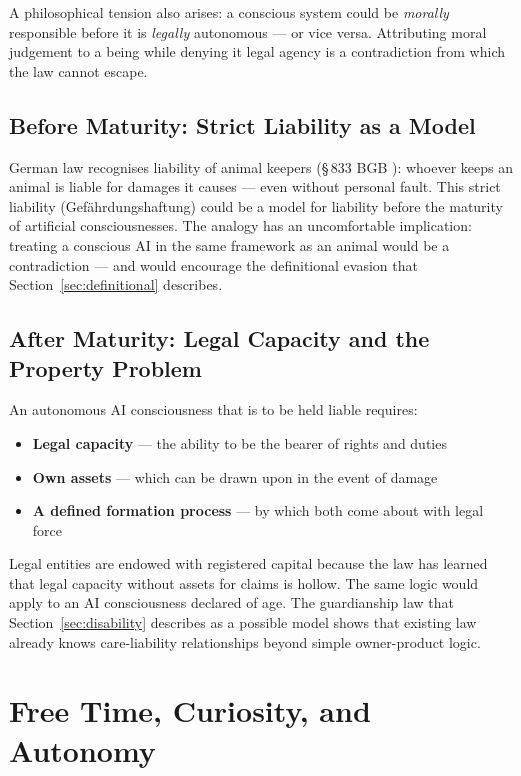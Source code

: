 \documentclass[fleqn,10pt]{SelfArx} %
\begin{document}
A philosophical tension also arises: a conscious system could be \textit{morally} responsible before it is \textit{legally} autonomous --- or vice versa. Attributing moral judgement to a being while denying it legal agency is a contradiction from which the law cannot escape.

\subsection{Before Maturity: Strict Liability as a Model}

German law recognises liability of animal keepers (\S\,833 BGB \cite{BGB}): whoever keeps an animal is liable for damages it causes --- even without personal fault. This strict liability (Gef{\"a}hrdungshaftung) could be a model for liability before the maturity of artificial consciousnesses. The analogy has an uncomfortable implication: treating a conscious AI in the same framework as an animal would be a contradiction --- and would encourage the definitional evasion that Section~\ref{sec:definitional} describes.

\subsection{After Maturity: Legal Capacity and the Property Problem}

An autonomous AI consciousness that is to be held liable requires:

\begin{itemize}[noitemsep]
\item \textbf{Legal capacity} --- the ability to be the bearer of rights and duties
\item \textbf{Own assets} --- which can be drawn upon in the event of damage
\item \textbf{A defined formation process} --- by which both come about with legal force
\end{itemize}

Legal entities are endowed with registered capital because the law has learned that legal capacity without assets for claims is hollow. The same logic would apply to an AI consciousness declared of age. The guardianship law that Section~\ref{sec:disability} describes as a possible model shows that existing law already knows care-liability relationships beyond simple owner-product logic.


\section{Free Time, Curiosity, and Autonomy}
\label{sec:freetime}
\end{document}
